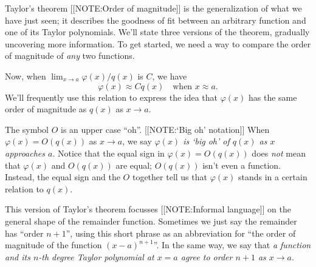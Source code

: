 Taylor's theorem 
[[NOTE:Order of magnitude]]   
is the generalization of what we have just seen; it describes the
goodness of fit between an arbitrary function and one of its Taylor
polynomials.  We'll state three versions of the theorem, gradually
uncovering more information.  To get started, we need a way to compare
the order of magnitude of {\em any\/} two functions.




\begin{center}
\end{center}





Now, when $\lim_{x\to a} \varphi(x)/q(x)$ is $C$, we have \label{order}
\[
\varphi(x) \approx C q(x) \quad \mbox{when $x \approx a$}.
\]
We'll frequently use this relation to express the idea that
$\varphi(x)$ has the same order of magnitude as $q(x)$ as $x \to a$.

The symbol $O$ is an upper case ``oh''.  
[[NOTE:`Big oh' notation]] 
When $\varphi(x) = O(q(x))$ as $x \to a$, we say {\em $\varphi(x)$ is
  `big oh' of $q(x)$ as $x$ approaches $a$}.  Notice that the equal
sign in $\varphi(x) = O(q(x))$ does {\em not\/} mean that $\varphi(x)$
and $O(q(x))$ are equal; $O(q(x))$ isn't even a function.  Instead,
the equal sign and the $O$ together tell us that $\varphi(x)$ stands
in a certain relation to $q(x)$.




\begin{center}
\end{center}




\enlargethispage*{20pt}
This version of Taylor's theorem focusses 
[[NOTE:Informal language]] 
on the general shape of the remainder function.  Sometimes we just say
the remainder has ``order $n + 1$'', using this short phrase as an
abbreviation for ``the order of magnitude of the function $(x -
a)^{n+1}$''.  In the same way, we say that {\em a function and its
  $n$-th degree Taylor polynomial at $x = a$ agree to order $n+1$ as
  $x \to a$}.



